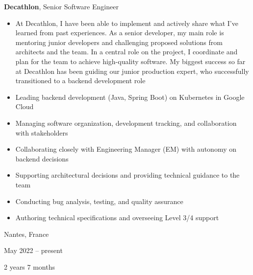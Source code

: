 \documentclass[10pt, letterpaper]{article}
\newenvironment{highlights}{
    \begin{itemize}[
        topsep=0.10 cm,
        parsep=0.10 cm,
        partopsep=0pt,
        itemsep=0pt,
        leftmargin=0.4 cm + 10pt
    ]
}{
    \end{itemize}
} %
\newenvironment{twocolentry}[2][]{
    \onecolentry
    \def\secondColumn{#2}
    \setcolumnwidth{\fill, 4.5 cm}
    \begin{paracol}{2}
}{
    \switchcolumn \raggedleft \secondColumn
    \end{paracol}
    \endonecolentry
} %
\begin{document}
        
        \begin{twocolentry}{
            Nantes, France

        May 2022 – present

        2 years 7 months
        }
            \textbf{Decathlon}, Senior Software Engineer
            \begin{highlights}
                \item At Decathlon, I have been able to implement and actively share what I’ve learned from past experiences. As a senior developer, my main role is mentoring junior developers and challenging proposed solutions from architects and the team. In a central role on the project, I coordinate and plan for the team to achieve high-quality software. My biggest success so far at Decathlon has been guiding our junior production expert, who successfully transitioned to a backend development role
                \item Leading backend development (Java, Spring Boot) on Kubernetes in Google Cloud
                \item Managing software organization, development tracking, and collaboration with stakeholders
                \item Collaborating closely with Engineering Manager (EM) with autonomy on backend decisions
                \item Supporting architectural decisions and providing technical guidance to the team
                \item Conducting bug analysis, testing, and quality assurance
                \item Authoring technical specifications and overseeing Level 3/4 support
            \end{highlights}
        \end{twocolentry}


        \vspace{0.2 cm}
\end{document}
